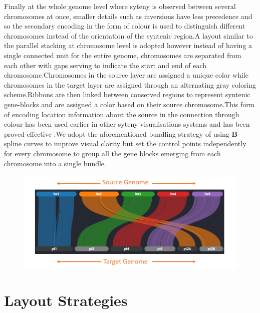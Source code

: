 Finally at the whole genome level where syteny is observed between several chromosomes at once, smaller details such as inversions have less precedence and so the secondary encoding in the form of colour is used to distinguish different chromosomes instead of the orientation of the syntenic region.A layout similar to the parallel stacking at chromosome level is adopted however instead of having a single connected unit for the entire genome, chromosomes are separated from each other with gaps serving to indicate the start and end of each chromosome.Chromosomes in the source layer are assigned a unique color while chromosomes in the target layer are assigned through an alternating gray coloring scheme.Ribbons are then linked between conserved regions to represent syntenic gene-blocks and are assigned a color based on their source chromosome.This form of encoding location information about the source in the connection through colour has been used earlier in other syteny visualisations systems and has been proved effective \cite{Meyer2009}.We adopt the aforementioned bundling strategy of using \textbf{B}-spline curves\cite{ref851370272} to improve visual clarity but set the control points independently for every chromosome to group all the gene blocks emerging from each chromosome into a single bundle.


\begin{figure}[ht]
  \centering
  \includegraphics[width=.75\linewidth]{images/ch_4_genome_level.PNG}
  \label{fig:ch_4_genome_level}
\end{figure}



\section{Layout Strategies}

